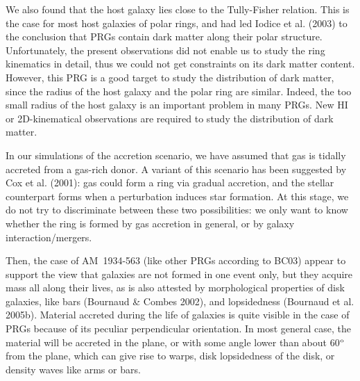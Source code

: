 \documentclass[]{aa}
\begin{document}
We also found that the host galaxy lies close to the Tully-Fisher relation. 
This is the case for most host galaxies of polar rings, and had led 
Iodice et al. (2003) to the conclusion that PRGs contain dark matter 
along their polar structure. Unfortunately, the present observations 
did not enable us to study the ring kinematics in detail, thus we could 
not get constraints on its dark matter content. However, this PRG is a 
good target to study the distribution of dark matter, since the radius 
of the host galaxy and the polar ring are similar. Indeed, the too 
small radius of the host galaxy is an important problem in many PRGs. 
New HI or 2D-kinematical observations are required to study the 
distribution of dark matter.

In our simulations of the accretion scenario, we have assumed that gas is 
tidally accreted from a gas-rich donor. A variant of this scenario has been 
suggested by Cox et al. (2001): gas could form a ring via gradual accretion, 
and the stellar counterpart forms when a perturbation induces star formation. 
At this stage, we do not try to discriminate between these two possibilities: 
we only want to know whether the ring is formed by gas accretion in general, 
or by galaxy interaction/mergers.

Then, the case of AM~1934-563 (like other PRGs according to BC03) appear to support 
the view that galaxies are not formed in one event only, but they acquire mass 
all along their lives, as is also attested by morphological properties of disk 
galaxies, like bars (Bournaud \& Combes 2002), and lopsidedness (Bournaud et al. 2005b). 
Material accreted during the life of galaxies is quite visible in the case of PRGs 
because of its peculiar perpendicular orientation. In most general case, the material 
will be accreted in the plane, or with some angle lower than about 60$^{\rm o}$ 
from the plane, which can give rise to warps, disk lopsidedness of the disk, or 
density waves like arms or bars.

\end{document}
